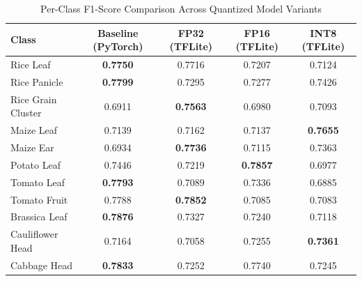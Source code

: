 \documentclass{article}
\begin{document}
\begin{table}[htbp]
  \centering
  \caption{Per-Class F1-Score Comparison Across Quantized Model Variants}
  \label{tab:per_class_f1_comparison}
  \small
  \begin{tabular}{lcccc}
    \toprule
    \textbf{Class} & \textbf{Baseline (PyTorch)} & \textbf{FP32 (TFLite)} & \textbf{FP16 (TFLite)} & \textbf{INT8 (TFLite)} \\
    \midrule
    Rice Leaf & \textbf{0.7750} & 0.7716 & 0.7207 & 0.7124 \\
    Rice Panicle & \textbf{0.7799} & 0.7295 & 0.7277 & 0.7426 \\
    Rice Grain Cluster & 0.6911 & \textbf{0.7563} & 0.6980 & 0.7093 \\
    Maize Leaf & 0.7139 & 0.7162 & 0.7137 & \textbf{0.7655} \\
    Maize Ear & 0.6934 & \textbf{0.7736} & 0.7115 & 0.7363 \\
    Potato Leaf & 0.7446 & 0.7219 & \textbf{0.7857} & 0.6977 \\
    Tomato Leaf & \textbf{0.7793} & 0.7089 & 0.7336 & 0.6885 \\
    Tomato Fruit & 0.7788 & \textbf{0.7852} & 0.7085 & 0.7083 \\
    Brassica Leaf & \textbf{0.7876} & 0.7327 & 0.7240 & 0.7118 \\
    Cauliflower Head & 0.7164 & 0.7058 & 0.7255 & \textbf{0.7361} \\
    Cabbage Head & \textbf{0.7833} & 0.7252 & 0.7740 & 0.7245 \\
    \bottomrule
  \end{tabular}
\end{table}
\end{document}
